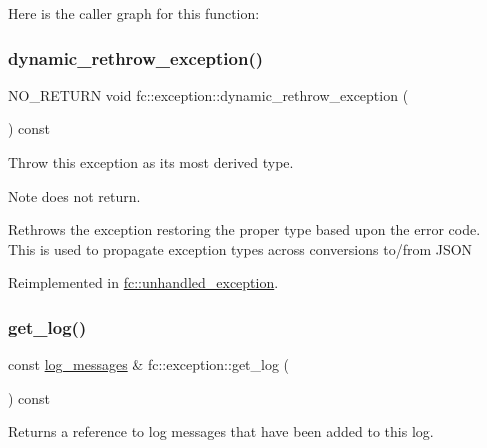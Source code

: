 Here is the caller graph for this function\+:
\mbox{\label{classfc_1_1exception_ace951e3b4efa51ea203b0e111f7e99a2}} 
\subsubsection{\texorpdfstring{dynamic\+\_\+rethrow\+\_\+exception()}{dynamic\_rethrow\_exception()}}
{\footnotesize\ttfamily N\+O\+\_\+\+R\+E\+T\+U\+RN void fc\+::exception\+::dynamic\+\_\+rethrow\+\_\+exception (\begin{DoxyParamCaption}{ }\end{DoxyParamCaption}) const\hspace{0.3cm}{\ttfamily [virtual]}}

Throw this exception as its most derived type.

\begin{DoxyNote}{Note}
does not return.
\end{DoxyNote}
Rethrows the exception restoring the proper type based upon the error code. This is used to propagate exception types across conversions to/from J\+S\+ON 

Reimplemented in \mbox{\hyperlink{classfc_1_1unhandled__exception_a8177e0f7154591583154cf4e4ccf0c9e}{fc\+::unhandled\+\_\+exception}}.

\mbox{\label{classfc_1_1exception_a70b72c1e4fe0d17485a8b7a0a6f397de}} 
\subsubsection{\texorpdfstring{get\+\_\+log()}{get\_log()}}
{\footnotesize\ttfamily const \mbox{\hyperlink{classstd_1_1vector}{log\+\_\+messages}} \& fc\+::exception\+::get\+\_\+log (\begin{DoxyParamCaption}{ }\end{DoxyParamCaption}) const}

\begin{DoxyReturn}{Returns}
a reference to log messages that have been added to this log. 
\end{DoxyReturn}
\mbox{\label{classfc_1_1exception_a7611ea8fbe25dde56649b685c2298a37}} 
